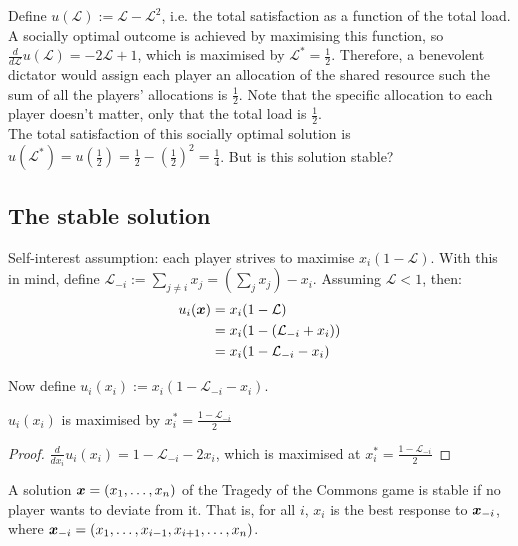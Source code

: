 Define $u(\mathcal{L}) := \mathcal{L} - \mathcal{L}^2$, i.e. the total
satisfaction as a function of the total load. \\

A socially optimal outcome is achieved by maximising this function, so
$\frac{d}{d\mathcal{L}} u(\mathcal{L}) = -2\mathcal{L} + 1$, which is maximised
by $\mathcal{L}^* = \frac{1}{2}$. Therefore, a benevolent dictator would assign
each player an allocation of the shared resource such the sum of all the
players' allocations is $\frac{1}{2}$.  Note that the specific allocation to
each player doesn't matter, only that the total load is $\frac{1}{2}$. \\

The total satisfaction of this socially optimal solution is $u(\mathcal{L}^*) =
u(\frac{1}{2}) = \frac{1}{2} - (\frac{1}{2})^2 = \frac{1}{4}$. But is this
solution stable?

\subsection{The stable solution}

Self-interest assumption: each player strives to maximise $x_i (1 -
\mathcal{L})$. With this in mind, define $\mathcal{L}_{-i} := \sum_{j \neq i}
x_j = (\sum_j x_j) - x_i$. Assuming $\mathcal{L} < 1$, then:
\begin{equation}
	\begin{split}
		u_i(\bm{x}) & = x_i (1 - \mathcal{L}) \\
		& = x_i (1 - (\mathcal{L}_{-i} + x_i)) \\
		& = x_i (1 - \mathcal{L}_{-i} - x_i)
	\end{split}
\end{equation}

Now define $u_i(x_i) := x_i (1 - \mathcal{L}_{-i} - x_i)$.

\begin{claim}
	$u_i(x_i)$ is maximised by $x_i^* = \frac{1 -
	\mathcal{L}_{-i}}{2}$
\end{claim}

\begin{proof}
	$\frac{d}{dx_i} u_i(x_i) = 1 - \mathcal{L}_{-i} - 2x_i$,
	which is maximised at $x_i^* = \frac{1 - \mathcal{L}_{-i}}{2}$
\end{proof}

\begin{definition}
	A solution $\bm{x} = (x_1, \ldots, x_n)$ of the Tragedy of the Commons
	game is stable if no player wants to deviate from it. That is, for all $i$,
	$x_i$ is the best response to $\bm{x}_{-i}$, where $\bm{x}_{-i} = (x_1,
	\ldots, x_{i-1}, x_{i+1}, \ldots, x_n)$.
\end{definition}


